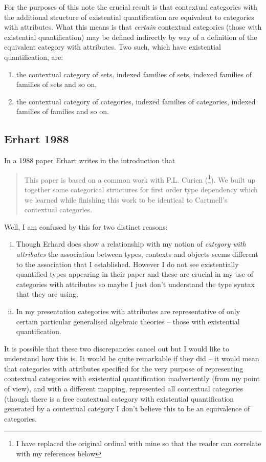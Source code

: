\documentclass[14pt,a4paper]{scrartcl}
\begin{document}
For the purposes of this note the crucial result is that contextual categories with the additional structure of existential quantification are equivalent to categories with attributes.
What this means is that \textit{certain} contextual 
categories (those with existential quantification) may be defined indirectly by way of a definition of the equivalent category with attributes. Two such, which have existential quantification, are:
\begin{enumerate}
\item the contextual category  of sets, indexed families of sets, indexed families of families of sets and so on,
\item the contextual category of categories, indexed families of categories, indexed families of families and so on.
\end{enumerate}


\subsection{Erhart 1988}
In a 1988 paper Erhart \cite{erhard88} writes in the introduction that
\begin{quote}
This paper is based on a common work with P.L. Curien (\cite{curien89}\footnote{I have replaced the original ordinal with mine so that the reader can correlate with my references below}). We built up together some categorical structures for first order type dependency which we learned while finishing this work to be identical to Cartmell's contextual categories.
\end{quote}
\noindent
Well, I am confused by this for two distinct reasons:
\begin{enumerate} [(i)]
\item Though Erhard does show a relationship with my notion of \textit{category with attributes} 
the association between types, contexts and objects seems different to the association that I 
established. However I do not see existentially quantified types appearing in their paper and these are crucial in my use of categories with attributes so maybe I just don't understand the 
type syntax that they are using.
\item In my presentation categories with attributes are representative of only certain particular generalised algebraic theories -- those with existential quantification.
\end{enumerate}
It is possible that these two discrepancies cancel out but I would like to understand how this is. It would be quite remarkable if they did -- it would mean that  categories with attributes specified for the very purpose of representing contextual categories with existential quantification inadvertently (from my point of view), and with a different mapping, represented all contextual categories (though there is a free contextual category with existential quantification generated by a contextual category I don't believe this to be an equivalence of categories.
\end{document}
